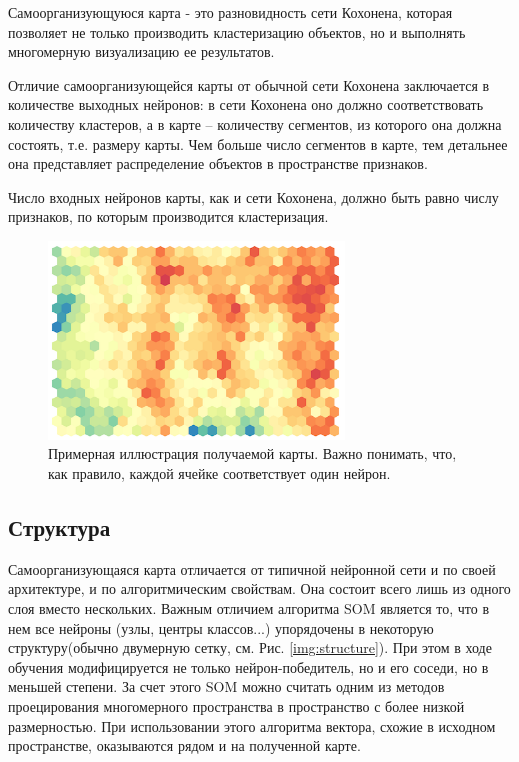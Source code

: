 \documentclass[a4paper,12pt]{article}
\begin{document}
Самоорганизующуюся карта - это разновидность сети Кохонена, которая позволяет не только производить кластеризацию объектов, но и выполнять многомерную визуализацию ее результатов.

Отличие самоорганизующейся карты от обычной сети Кохонена заключается в количестве выходных нейронов: в сети Кохонена оно должно соответствовать количеству кластеров, а в карте – количеству сегментов, из которого она должна состоять, т.е. размеру карты. Чем больше число сегментов в карте, тем детальнее она представляет распределение объектов в пространстве признаков.

Число входных нейронов карты, как и сети Кохонена, должно быть равно числу признаков, по которым производится кластеризация.

\begin{figure}[H]
  \centering
  \includegraphics[width=0.7\textwidth]{every-cell-neuron.png}
  \caption{Примерная иллюстрация получаемой карты. Важно понимать, что, как правило, каждой ячейке соответствует один нейрон.}
  \label{every_cell_neuron}
\end{figure}

\subsection{Структура}

Самоорганизующаяся карта отличается от типичной нейронной сети и по своей архитектуре, и по алгоритмическим свойствам. Она состоит всего лишь из одного слоя вместо нескольких. Важным отличием алгоритма SOM является то, что в нем все нейроны (узлы, центры классов...) упорядочены в некоторую структуру(обычно двумерную сетку, см. Рис. \ref{img:structure}). При этом в ходе обучения модифицируется не только нейрон-победитель, но и его соседи, но в меньшей степени. За счет этого SOM можно считать одним из методов проецирования многомерного пространства в пространство с более низкой размерностью. При использовании этого алгоритма вектора, схожие в исходном пространстве, оказываются рядом и на полученной карте.\cite{basegroup}
\end{document}

